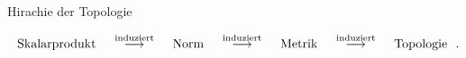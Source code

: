 \documentclass[class=article, crop=false]{standalone}
\begin{document}
\begin{zettel}{Hirachie der Topologie}
\begin{flashcard}[]{}
	\[
		\tx{ Skalarprodukt } \stackrel{ \tx{ induziert } }{\longrightarrow} \tx{ Norm } \stackrel{\tx{ induziert } }{\longrightarrow} \tx{ Metrik }  \stackrel{\tx{ induziert } }{\longrightarrow} \tx{ Topologie }\\
	.\]
\end{flashcard}

\end{zettel}
\end{document}
